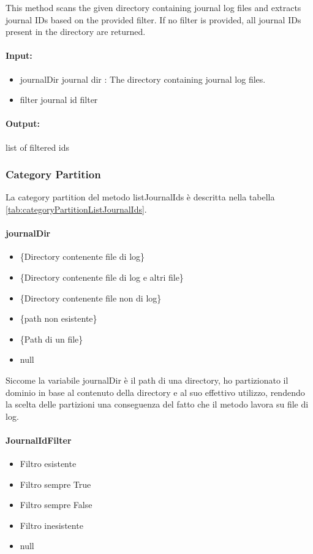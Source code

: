 \documentclass[12pt, a4paper]{article}
\begin{document}
This method scans the given directory containing journal log files and extracts
journal IDs based on the provided filter. If no filter is provided, all journal
IDs present in the directory are returned.


\paragraph{Input:}
\begin{itemize}
  \item journalDir journal dir : The directory containing journal log files.
  \item filter journal id filter
\end{itemize}
\paragraph{Output:}
    list of filtered ids

\subsubsection{Category Partition}

La category partition del metodo listJournalIds è descritta nella tabella \ref{tab:categoryPartitionListJournalIds}.



\paragraph{journalDir}
\begin{itemize}
  \item \{Directory contenente file di log\}
  \item \{Directory contenente file di log e altri file\}
  \item \{Directory contenente file non di log\}
  \item \{path non esistente\}
  \item \{Path di un file\}
  \item null
\end{itemize}
Siccome la variabile journalDir è il path di una directory, ho partizionato 
il dominio in base al contenuto della directory e al suo effettivo utilizzo, rendendo la scelta delle partizioni 
una conseguenza del fatto che il metodo lavora su file di log.

\paragraph{JournalIdFilter}
\begin{itemize}
    \item Filtro esistente
    \item Filtro sempre True
    \item Filtro sempre False
    \item Filtro inesistente
    \item null
\end{itemize}
\end{document}

